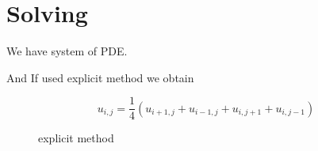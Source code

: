

\section*{Solving}

We have system of PDE.

And If used explicit method we obtain 

\begin{equation}
    u_{i, j} = \frac{1}{4} (u_{i+1,j} + u_{i-1,j} + u_{i,j+1} + u_{i,j-1}) 
\end{equation}

\begin{figure}[h!]
\caption{explicit method}
\end{figure}


